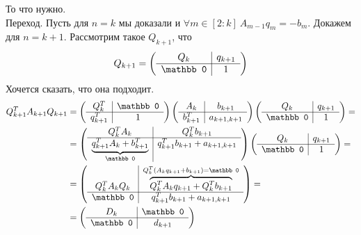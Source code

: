 \documentclass{article}
\begin{document}
\begin{itemize}
\begin{Proof}
$$            $$
            То что нужно.\\
            Переход. Пусть для $n=k$ мы доказали и $\forall m\in[2:k]~A_{m-1}q_m=-b_m$. Докажем для $n=k+1$. Рассмотрим такое $Q_{k+1}$, что
            $$
            Q_{k+1}=\arr{c|c}{Q_{k} & q_{k+1}\\\hline \mathbb0 & 1}
            $$
            Хочется сказать, что она подходит.
            \[\begin{split}
                Q_{k+1}^TA_{k+1}Q_{k+1}&=\arr{c|c}{Q_k^T & \mathbb0\\\hline q_{k+1}^T & 1}\arr{c|c}{A_k & b_{k+1}\\\hline b_{k+1}^T & a_{k+1,k+1}}\arr{c|c}{Q_{k} & q_{k+1}\\\hline \mathbb0 & 1}=\\
                &=\arr{c|c}{Q_k^TA_k & Q_k^Tb_{k+1}\\\hline \underbrace{q^T_{k+1}A_k+b_{k+1}^T}_{\mathbb0} & q_{k+1}^Tb_{k+1}+a_{k+1,k+1}}\arr{c|c}{Q_{k} & q_{k+1}\\\hline \mathbb0 & 1}=\\
                &=\arr{c|c}{Q_k^TA_kQ_k & \overbrace{Q_k^TA_kq_{k+1}+Q_k^Tb_{k+1}}^{Q_k^T(A_kq_{k+1}+b_{k+1})=\mathbb0}\\\hline\mathbb0 & q_{k+1}^Tb_{k+1}+a_{k+1,k+1}}=\\
                &=\arr{c|c}{D_k & \mathbb0\\\hline\mathbb0&d_{k+1}}
            \end{split}\]
        \end{Proof}
    \end{itemize}
\end{document}
